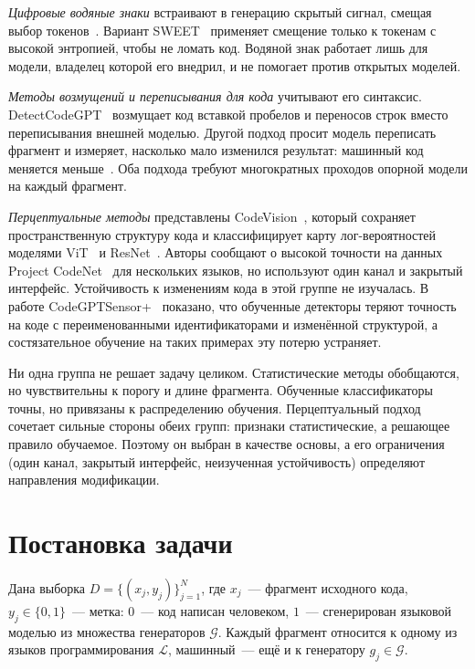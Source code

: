 \documentclass{misisarticle}
\begin{document}
\textit{Цифровые водяные знаки} встраивают в генерацию скрытый сигнал, смещая выбор токенов~\cite{kirchenbauer}. Вариант SWEET~\cite{sweet} применяет смещение только к токенам с высокой энтропией, чтобы не ломать код. Водяной знак работает лишь для модели, владелец которой его внедрил, и не помогает против открытых моделей.

\textit{Методы возмущений и переписывания для кода} учитывают его синтаксис. DetectCodeGPT~\cite{detectcodegpt} возмущает код вставкой пробелов и переносов строк вместо переписывания внешней моделью. Другой подход просит модель переписать фрагмент и измеряет, насколько мало изменился результат: машинный код меняется меньше~\cite{rewriting}. Оба подхода требуют многократных проходов опорной модели на каждый фрагмент.

\textit{Перцептуальные методы} представлены CodeVision~\cite{codevision}, который сохраняет пространственную структуру кода и классифицирует карту лог-вероятностей моделями ViT~\cite{vit} и ResNet~\cite{resnet}. Авторы сообщают о высокой точности на данных Project CodeNet~\cite{codenet} для нескольких языков, но используют один канал и закрытый интерфейс. Устойчивость к изменениям кода в этой группе не изучалась. В работе CodeGPTSensor+~\cite{codegptsensor} показано, что обученные детекторы теряют точность на коде с переименованными идентификаторами и изменённой структурой, а состязательное обучение на таких примерах эту потерю устраняет.

Ни одна группа не решает задачу целиком. Статистические методы обобщаются, но чувствительны к порогу и длине фрагмента. Обученные классификаторы точны, но привязаны к распределению обучения. Перцептуальный подход сочетает сильные стороны обеих групп: признаки статистические, а решающее правило обучаемое. Поэтому он выбран в качестве основы, а его ограничения (один канал, закрытый интерфейс, неизученная устойчивость) определяют направления модификации.

\section{Постановка задачи}

Дана выборка $D = \{(x_j, y_j)\}_{j=1}^{N}$, где $x_j$~--- фрагмент исходного кода, $y_j \in \{0, 1\}$~--- метка: $0$~--- код написан человеком, $1$~--- сгенерирован языковой моделью из множества генераторов $\mathcal{G}$. Каждый фрагмент относится к одному из языков программирования $\mathcal{L}$, машинный~--- ещё и к генератору $g_j \in \mathcal{G}$.
\end{document}
